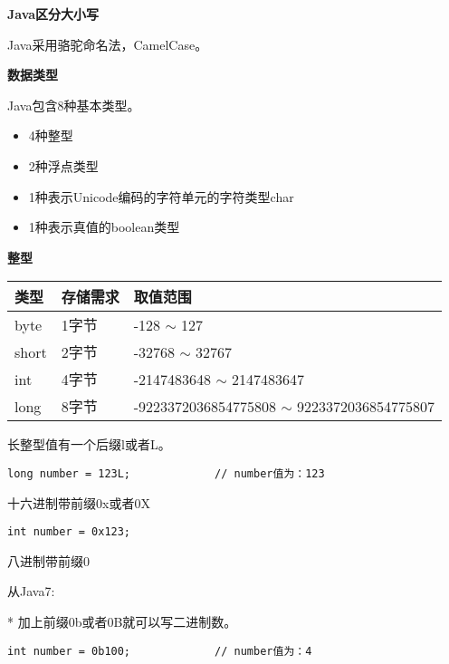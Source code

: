\textbf{Java区分大小写}

Java采用骆驼命名法，CamelCase。

\textbf{数据类型}

Java包含8种基本类型。\par
\begin{itemize}
        \item   4种整型
        \item   2种浮点类型 
        \item   1种表示Unicode编码的字符单元的字符类型char
        \item   1种表示真值的boolean类型
\end{itemize}


\textbf{整型}

\renewcommand\arraystretch{2}
\begin{tabular}{l|l|l}
    类型        &      存储需求        &     取值范围        \\               \hline
    byte       &       1字节          & -128 $\sim$ 127     \\
    short      &       2字节          & -32768 $\sim$ 32767  \\
    int        &       4字节          &  -2147483648 $\sim$ 2147483647  \\
    long       &       8字节          &  -9223372036854775808 $\sim$ 9223372036854775807  \\
\end{tabular}\newline


长整型值有一个后缀l或者L。

\begin{lstlisting}[style=cjava]
        long number = 123L;             // number值为：123
\end{lstlisting}

十六进制带前缀0x或者0X

\begin{lstlisting}[style=cjava]
        int number = 0x123;       
\end{lstlisting}

八进制带前缀0

从Java7:

* 加上前缀0b或者0B就可以写二进制数。

\begin{lstlisting}[style=cjava]
        int number = 0b100;             // number值为：4
\end{lstlisting}

